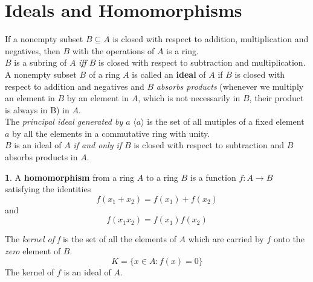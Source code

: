 \documentclass[a4paper,12pt]{article}
\theoremstyle{definition}
\newtheorem{definition}{}[section]
\theoremstyle{axiom}
\theoremstyle{theorem}
\theoremstyle{lemma}
\begin{document}
\section{Ideals and Homomorphisms}
If a nonempty subset $B \subseteq A$ is closed with respect to addition, multiplication and negatives, then $B$ with the operations of $A$ is a ring.
\\
$B$ is a subring of $A$ \textit{iff} $B$ is closed with respect to subtraction and multiplication.
\\
A nonempty subset $B$ of a ring $A$ is called an \textbf{ideal} of $A$ if $B$ is closed with respect to addition and negatives and $B$ \textit{absorbs products} (whenever we multiply an element in $B$ by an element in $A$, which is not necessarily in $B$, their product is always in B) in $A$.
\\
The \textit{principal ideal generated by $a$} $\langle a \rangle$ is the set of all mutiples of a fixed element $a$ by all the elements in a commutative ring with unity.
\\
$B$ is an ideal of $A$ \textit{if and only if} $B$ is closed with respect to subtraction and $B$ absorbs products in $A$.
\begin{definition}{}
    A \textbf{homomorphism} from a ring $A$ to a ring $B$ is a function $f: A \to B$ satisfying the identities 
        \begin{equation*}
            f(x_1+x_2)=f(x_1)+f(x_2)
        \end{equation*}
        and
        \begin{equation*}
            f(x_1x_2)=f(x_1)f(x_2)
        \end{equation*}
\end{definition}
The \textit{kernel of f} is the set of all the elements of $A$ which are carried by $f$ onto the \textit{zero} element of $B$.
\begin{equation*}
    K = \{x\in A: f(x)=0\}
\end{equation*}
The kernel of $f$ is an ideal of $A$.
\end{document}
